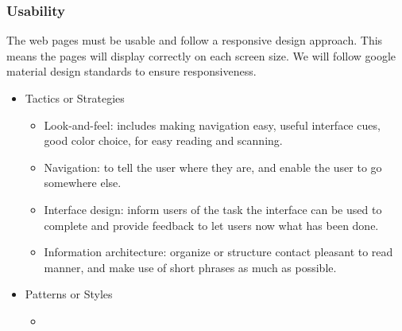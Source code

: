 \subsubsection{Usability}
		The web pages must be usable and follow a responsive design approach. This means the pages will display correctly on each screen size. We will follow google material design standards to ensure responsiveness.
		\begin{itemize}
	\item{Tactics or Strategies}
		\begin{itemize}
			\item Look-and-feel: includes making navigation easy, useful interface cues, good color choice, for easy reading and scanning.
			\item Navigation: to tell the user where they are, and enable the user to go somewhere else.
			\item Interface design: inform users of the task the interface can be used to complete and provide feedback to let users now what has been done.
			\item Information architecture: organize or structure contact pleasant to read manner, and make use of short phrases as much as possible.
		\end{itemize}
	\item{Patterns or Styles}
		\begin{itemize}
			\item
		\end{itemize}
\end{itemize}
		
